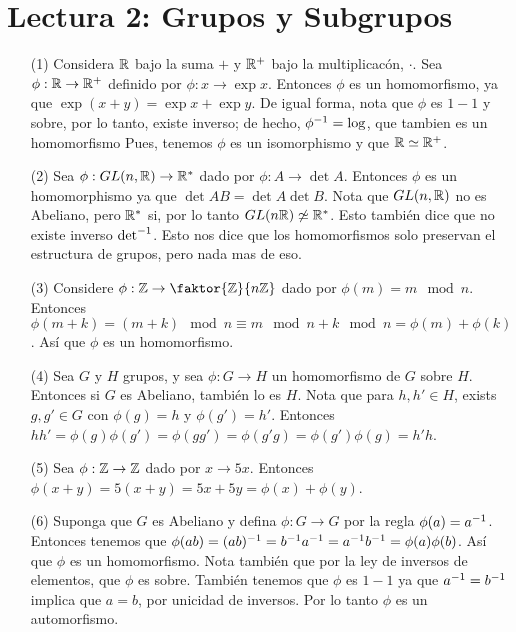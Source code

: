 \section*{Lectura 2: Grupos y Subgrupos}

\begin{example}\label{}
    \begin{enumerate}
        \item[(1)] Considera $\mathbb{R}$ bajo la suma  $+$ y  $\mathbb{R}^+$ bajo la
            multiplicac\'on,  $\cdot$. Sea  $\phi:\mathbb{R} \rightarrow \mathbb{R}^+$ definido
            por $\phi:x \rightarrow \exp{x}$. Entonces $\phi$ es un
            homomorfismo, ya que  $\exp{(x+y)}=\exp{x}+\exp{y}$. De igual
            forma, nota que $\phi$ es  $1-1$ y sobre, por lo tanto, existe
            inverso; de hecho,  $\phi^{-1}=\log$, que tambien es un
            homomorfismo Pues, tenemos $\phi$ es un isomorphismo y que  $\mathbb{R}
            \simeq \mathbb{R}^+$.

        \item[(2)] Sea $\phi:GL(n,\mathbb{R}) \rightarrow \mathbb{R}^*$ dado por $\phi:A
            \rightarrow \det{A}$. Entonces $\phi$ es un homomorphismo ya que
            $\det{AB}=\det{A}\det{B}$. Nota que $GL(n,\mathbb{R})$ no es Abeliano, pero
            $\mathbb{R}^*$ si, por lo tanto  $GL(n\mathbb{R}) \not\simeq \mathbb{R}^*$. Esto tambi\'en
            dice que no existe inverso $\det^{-1}$. Esto nos dice que los
            homomorfismos solo preservan el estructura de grupos, pero nada mas
            de eso.

        \item[(3)] Considere $\phi:\Z \rightarrow \faktor{\Z}{n\Z}$ dado por
            $\phi(m)=m \mod{n}$. Entonces $\phi(m+k)=(m+k) \mod{n} \equiv m
            \mod{n}+k \mod{n}=\phi(m)+\phi(k)$. As\'i que $\phi$ es un
            homomorfismo.

        \item[(4)] Sea $G$ y  $H$ grupos, y sea  $\phi:G \rightarrow H$ un
            homomorfismo de $G$ sobre  $H$. Entonces si  $G$ es Abeliano,
            tambi\'en lo es  $H$. Nota que para  $h,h' \in H$, exists  $g,g' \in
            G$ con  $\phi(g)=h$ y $\phi(g')=h'$. Entonces
            $hh'=\phi(g)\phi(g')=\phi(gg')=\phi(g'g)=\phi(g')\phi(g)=h'h$.

        \item[(5)] Sea $\phi:\mathbb{Z} \rightarrow \mathbb{Z}$ dado por $x \rightarrow 5x$.
            Entonces $\phi(x+y)=5(x+y)=5x+5y=\phi(x)+\phi(y)$.

        \item[(6)] Suponga que $G$ es Abeliano y defina $\phi: G \rightarrow G$
            por la regla $\phi(a)=a^{-1}$. Entonces tenemos que
            $\phi(ab)=(ab)^{-1}=b^{-1}a^{-1}=a^{-1}b^{-1}=\phi(a)\phi(b)$.
            As\'i que $\phi$ es un homomorfismo. Nota tambi\'en que por la ley
            de inversos de elementos, que $\phi$ es sobre. Tambi\'en tenemos que
            $\phi$ es  $1-1$ ya que  $a^{-1}=b^{-1}$ implica que $a=b$, por
            unicidad de inversos. Por lo tanto  $\phi$ es un automorfismo.


\end{enumerate}
\end{example}
